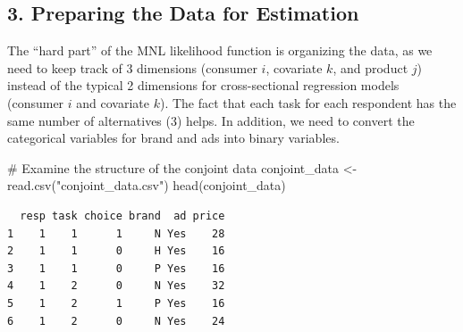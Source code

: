 \documentclass[
  letterpaper,
  DIV=11,
  numbers=noendperiod]{scrartcl}
\newenvironment{Shaded}{\begin{snugshade}}{\end{snugshade}}
\newcommand{\CommentTok}[1]{\textcolor[rgb]{0.37,0.37,0.37}{#1}}
\newcommand{\FunctionTok}[1]{\textcolor[rgb]{0.28,0.35,0.67}{#1}}
\newcommand{\NormalTok}[1]{\textcolor[rgb]{0.00,0.23,0.31}{#1}}
\newcommand{\OtherTok}[1]{\textcolor[rgb]{0.00,0.23,0.31}{#1}}
\newcommand{\StringTok}[1]{\textcolor[rgb]{0.13,0.47,0.30}{#1}}
\begin{document}
\subsection{3. Preparing the Data for
Estimation}\label{preparing-the-data-for-estimation}

The ``hard part'' of the MNL likelihood function is organizing the data,
as we need to keep track of 3 dimensions (consumer \(i\), covariate
\(k\), and product \(j\)) instead of the typical 2 dimensions for
cross-sectional regression models (consumer \(i\) and covariate \(k\)).
The fact that each task for each respondent has the same number of
alternatives (3) helps. In addition, we need to convert the categorical
variables for brand and ads into binary variables.

\begin{Shaded}
\begin{Highlighting}[]
\CommentTok{\# Examine the structure of the conjoint data}
\NormalTok{conjoint\_data }\OtherTok{\textless{}{-}} \FunctionTok{read.csv}\NormalTok{(}\StringTok{"conjoint\_data.csv"}\NormalTok{)}
\FunctionTok{head}\NormalTok{(conjoint\_data)}
\end{Highlighting}
\end{Shaded}

\begin{verbatim}
  resp task choice brand  ad price
1    1    1      1     N Yes    28
2    1    1      0     H Yes    16
3    1    1      0     P Yes    16
4    1    2      0     N Yes    32
5    1    2      1     P Yes    16
6    1    2      0     N Yes    24
\end{verbatim}
\end{document}
